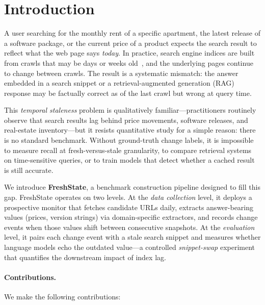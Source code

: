 \section{Introduction}
\label{sec:intro}

A user searching for the monthly rent of a specific apartment, the latest release
of a software package, or the current price of a product expects the search result
to reflect what the web page says \emph{today}. In practice, search engine indices
are built from crawls that may be days or weeks old~\citep{cho2003estimating}, and
the underlying pages continue to change between crawls. The result is a systematic
mismatch: the answer embedded in a search snippet or a retrieval-augmented generation
(RAG) response may be factually correct as of the last crawl but wrong at query time.

This \emph{temporal staleness} problem is qualitatively familiar---practitioners
routinely observe that search results lag behind price movements, software releases,
and real-estate inventory---but it resists quantitative study for a simple reason:
there is no standard benchmark. Without ground-truth change labels, it is impossible
to measure recall at fresh-versus-stale granularity, to compare retrieval systems on
time-sensitive queries, or to train models that detect whether a cached result is
still accurate.

We introduce \textbf{FreshState}, a benchmark construction pipeline designed to
fill this gap. FreshState operates on two levels. At the \emph{data collection}
level, it deploys a prospective monitor that fetches candidate URLs daily, extracts
answer-bearing values (prices, version strings) via domain-specific extractors, and
records change events when those values shift between consecutive snapshots. At the
\emph{evaluation} level, it pairs each change event with a stale search snippet and
measures whether language models echo the outdated value---a controlled
\emph{snippet-swap} experiment that quantifies the downstream impact of index lag.

\paragraph{Contributions.} We make the following contributions:

